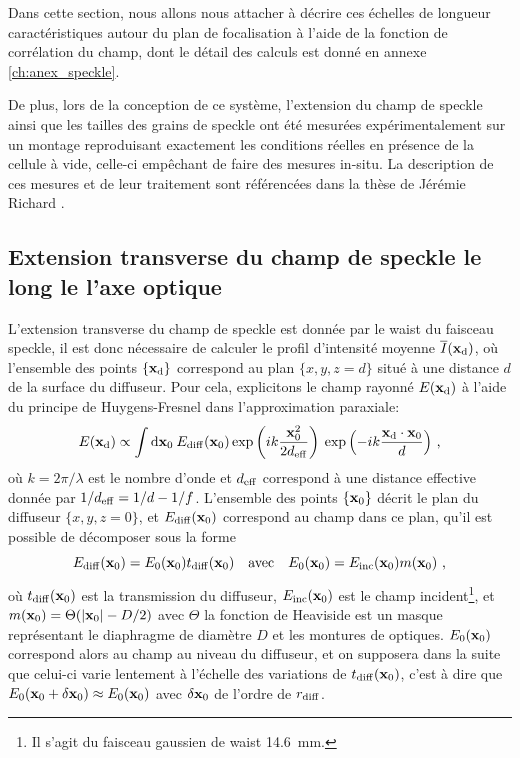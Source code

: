 Dans cette section, nous allons nous attacher à décrire ces échelles de longueur caractéristiques autour du plan de focalisation à l'aide de la fonction de corrélation du champ, dont le détail des calculs est donné en annexe \ref{ch:anex_speckle}. 

De plus, lors de la conception de ce système, l'extension du champ de speckle ainsi que les tailles des grains de speckle ont été mesurées expérimentalement sur un montage reproduisant exactement les conditions réelles en présence de la cellule à vide, celle-ci empêchant de faire des mesures in-situ. La description de ces mesures et de leur traitement sont référencées dans la thèse de Jérémie Richard \citep{richard2015propagation}.




\subsection{Extension transverse du champ de speckle le long le l'axe optique}
L'extension transverse du champ de speckle est donnée par le waist du faisceau speckle, il est donc nécessaire de calculer le profil d'intensité moyenne $\overline{I}(\mathbf{x}_{\mathrm{d}})$, où l'ensemble des points $\lbrace\mathbf{x}_{\mathrm{d}}\rbrace$ correspond au plan $\lbrace x,y,z=d \rbrace$ situé à une distance $d$ de la surface du diffuseur. Pour cela, explicitons le champ rayonné $E(\mathbf{x}_{\mathrm{d}})$ à l'aide du principe de Huygens-Fresnel dans l'approximation paraxiale:
\begin{equation}
E(\mathbf{x}_{\mathrm{d}}) \propto \int{\mathrm{d}\mathbf{x}_0\: E_{\mathrm{diff}}(\mathbf{x}_0) \exp{\left( ik\frac{\mathbf{x}_0^2}{2d_{\mathrm{eff}}} \right) } \: \exp{\left( -ik \frac{\mathbf{x}_{\mathrm{d}}\cdot \mathbf{x}_0}{d} \right) } } \text{ ,}
\label{eq:amplitude_rayonnee}
\end{equation}
où $k=2\pi/\lambda$ est le nombre d'onde et $d_{\mathrm{eff}}$ correspond à une distance effective donnée par $1/d_{\mathrm{eff}}=1/d-1/f$. L'ensemble des points $\lbrace\mathbf{x}_0\rbrace$ décrit le plan du diffuseur $\lbrace x,y,z=0 \rbrace$, et $E_{\mathrm{diff}} (\mathbf{x}_0)$ correspond au champ dans ce plan, qu'il est possible de décomposer sous la forme 
\begin{equation}
E_{\mathrm{diff}}(\mathbf{x}_0)=E_0(\mathbf{x}_0) t_{\mathrm{diff}}(\mathbf{x}_0) \quad \text{avec} \quad E_0(\mathbf{x}_0) = E_\mathrm{inc} (\mathbf{x}_0) m(\mathbf{x}_0) \text{ ,}
\end{equation}
où $t_{\mathrm{diff}}(\mathbf{x}_0)$ est la transmission du diffuseur, $E_{\mathrm{inc}}(\mathbf{x}_0)$ est le champ incident\footnote{Il s'agit du faisceau gaussien de waist \SI{14.6}{\milli\metre}.}, et $m(\mathbf{x}_0)=\Theta(\left| \mathbf{x}_0 \right| - D/2)$ avec $\Theta$ la fonction de Heaviside est un masque représentant le diaphragme de diamètre $D$ et les montures de optiques. $E_0(\mathbf{x}_0)$ correspond alors au champ au niveau du diffuseur, et on supposera dans la suite que celui-ci varie lentement à l'échelle des variations de $t_{\mathrm{diff}}(\mathbf{x}_0)$, c'est à dire que $E_0(\mathbf{x}_0+\delta\mathbf{x}_0)\approx E_0(\mathbf{x}_0)$ avec $\delta\mathbf{x}_0$ de l'ordre de $r_{\mathrm{diff}}$.

